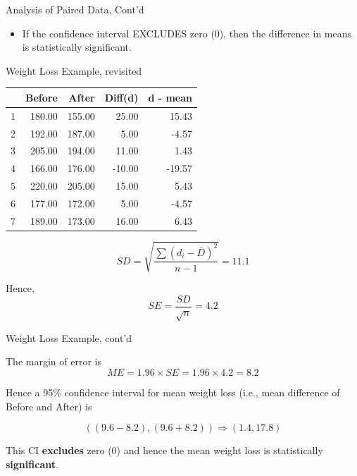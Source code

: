 \documentclass[14pt]{beamer}\usepackage[]{graphicx}\usepackage[]{color}
\begin{document}
\begin{frame}[fragile]{Analysis of Paired Data, Cont'd}

\begin{itemize}
\item If the confidence interval EXCLUDES zero (0), then the difference in means is statistically significant.
\end{itemize}
\end{frame}

\begin{frame}[fragile]{Weight Loss Example, revisited}

{\footnotesize{
\begin{table}[ht]
\centering
\begin{tabular}{rrrrr}
  \hline
 & Before & After & Diff(d) & d - mean \\ 
  \hline
1 & 180.00 & 155.00 & 25.00 & 15.43 \\ 
  2 & 192.00 & 187.00 & 5.00 & -4.57 \\ 
  3 & 205.00 & 194.00 & 11.00 & 1.43 \\ 
  4 & 166.00 & 176.00 & -10.00 & -19.57 \\ 
  5 & 220.00 & 205.00 & 15.00 & 5.43 \\ 
  6 & 177.00 & 172.00 & 5.00 & -4.57 \\ 
  7 & 189.00 & 173.00 & 16.00 & 6.43 \\ 
   \hline
\end{tabular}
\end{table}


\begin{equation*}
SD = \sqrt{ \frac{ \sum (d_i - \bar{D})^2}{n - 1}} = 11.1
\end{equation*}

Hence, 
\begin{equation*}
SE = \frac{SD}{\sqrt{n}} = 4.2
\end{equation*}
}}
\end{frame}
 
\begin{frame}[fragile]{Weight Loss Example, cont'd}
  
The margin of error is
 \begin{equation*}
 ME = 1.96 \times SE = 1.96 \times 4.2 = 8.2
\end{equation*}

Hence a 95\% confidence interval for mean weight loss (i.e., mean  difference of Before and After) is

\begin{equation*}
( (9.6 - 8.2), (9.6 + 8.2) )  \Rightarrow  (1.4, 17.8)
\end{equation*}

This CI \textbf{excludes} zero (0) and hence the mean weight loss is statistically \textbf{significant}.
\end{frame}
\end{document}
